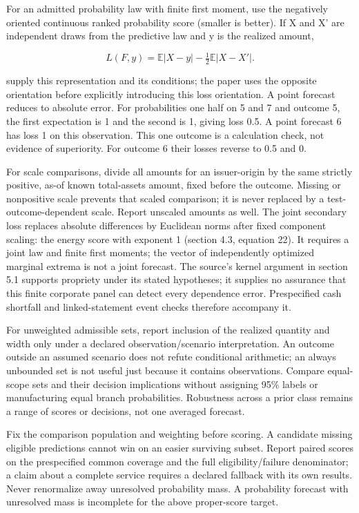 For an admitted probability law with finite first moment, use the negatively oriented continuous ranked probability score (smaller is better). If X and X' are independent draws from the predictive law and y is the realized amount,

\[L(F,y)=\mathbb E|X-y|-\tfrac12\mathbb E|X-X'|.\]

\citet[sec.~4.2, eqs.~20--21]{gneiting2007proper} supply this representation and its conditions; the paper uses the opposite orientation before explicitly introducing this loss orientation. A point forecast reduces to absolute error. For probabilities one half on 5 and 7 and outcome 5, the first expectation is 1 and the second is 1, giving loss 0.5. A point forecast 6 has loss 1 on this observation. This one outcome is a calculation check, not evidence of superiority. For outcome 6 their losses reverse to 0.5 and 0.

For scale comparisons, divide all amounts for an issuer-origin by the same strictly positive, as-of known total-assets amount, fixed before the outcome. Missing or nonpositive scale prevents that scaled comparison; it is never replaced by a test-outcome-dependent scale. Report unscaled amounts as well. The joint secondary loss replaces absolute differences by Euclidean norms after fixed component scaling: the energy score with exponent 1 (section 4.3, equation 22). It requires a joint law and finite first moments; the vector of independently optimized marginal extrema is not a joint forecast. The source's kernel argument in section 5.1 supports propriety under its stated hypotheses; it supplies no assurance that this finite corporate panel can detect every dependence error. Prespecified cash shortfall and linked-statement event checks therefore accompany it.

For unweighted admissible sets, report inclusion of the realized quantity and width only under a declared observation/scenario interpretation. An outcome outside an assumed scenario does not refute conditional arithmetic; an always unbounded set is not useful just because it contains observations. Compare equal-scope sets and their decision implications without assigning 95\% labels or manufacturing equal branch probabilities. Robustness across a prior class remains a range of scores or decisions, not one averaged forecast.

Fix the comparison population and weighting before scoring. A candidate missing eligible predictions cannot win on an easier surviving subset. Report paired scores on the prespecified common coverage and the full eligibility/failure denominator; a claim about a complete service requires a declared fallback with its own results. Never renormalize away unresolved probability mass. A probability forecast with unresolved mass is incomplete for the above proper-score target.

